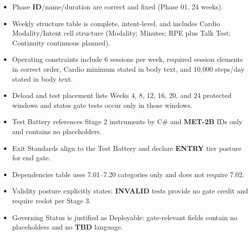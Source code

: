 \documentclass[10pt]{article}
\begin{document}
\begin{itemize}
\item Phase \textbf{ID}/name/duration are correct and fixed (Phase 01, 24 weeks).
\item Weekly structure table is complete, intent-level, and includes Cardio Modality/Intent cell structure (Modality; Minutes; RPE plus Talk Test; Continuity continuous planned).
\item Operating constraints include 6 sessions per week, required session elements in correct order, Cardio minimum stated in body text, and 10,000 steps/day stated in body text.
\item Deload and test placement lists Weeks 4, 8, 12, 16, 20, and 24 protected windows and states gate tests occur only in those windows.
\item Test Battery references Stage 2 instruments by C# and \textbf{MET-2B} IDs only and contains no placeholders.
\item Exit Standards align to the Test Battery and declare \textbf{ENTRY} tier posture for end gate.
\item Dependencies table uses 7.01–7.20 categories only and does not require 7.02.
\item Validity posture explicitly states: \textbf{INVALID} tests provide no gate credit and require reslot per Stage 3.
\item Governing Status is justified as Deployable: gate-relevant fields contain no placeholders and no \textbf{TBD} language.
\end{itemize}
\end{document}
